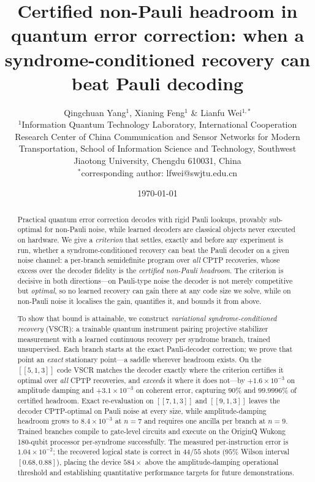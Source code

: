 \documentclass[aps,prxquantum,reprint,superscriptaddress]{revtex4-2}
\title{\textbf{Certified non-Pauli headroom in quantum error correction: when a
syndrome-conditioned recovery can beat Pauli decoding}}
\author{Qingchuan Yang$^{1}$, Xianing Feng$^{1}$ \& Lianfu Wei$^{1,*}$\\
\small $^{1}$Information Quantum Technology Laboratory, International
Cooperation Research Center of China Communication and Sensor Networks for
Modern Transportation, School of Information Science and Technology, Southwest
Jiaotong University, Chengdu 610031, China\\
\small $^{*}$corresponding author: lfwei@swjtu.edu.cn}
\date{\today}
\begin{document}
\maketitle

\begin{abstract}
\noindent
Practical quantum error correction decodes with rigid Pauli lookups, provably
sub-optimal for non-Pauli noise, while learned decoders are classical objects never
executed on hardware. We give a \emph{criterion} that settles, exactly and before
any experiment is run, whether a syndrome-conditioned recovery can beat the Pauli
decoder on a given noise channel: a per-branch semidefinite program over \emph{all}
CPTP recoveries, whose excess over the decoder fidelity is the \emph{certified
non-Pauli headroom}. The criterion is decisive in both directions---on Pauli-type
noise the decoder is not merely competitive but \emph{optimal}, so no learned
recovery can gain there at any code size we solve, while on non-Pauli noise it
localises the gain, quantifies it, and bounds it from above.

To show that bound is attainable, we construct \emph{variational syndrome-conditioned
recovery} (VSCR): a trainable quantum instrument pairing projective stabilizer
measurement with a learned continuous recovery per syndrome branch, trained 
unsupervised. Each branch starts at the exact Pauli-decoder correction; we prove 
that point an \emph{exact} stationary point---a saddle wherever headroom exists. 
On the $[\![5,1,3]\!]$ code VSCR matches the decoder exactly where the criterion 
certifies it optimal over \emph{all} CPTP recoveries, and \emph{exceeds} it where 
it does not---by $+1.6\times10^{-3}$ on amplitude damping and $+3.1\times10^{-3}$ 
on coherent error, capturing $90\%$ and $99.9996\%$ of certified headroom. Exact 
re-evaluation on $[\![7,1,3]\!]$ and $[\![9,1,3]\!]$ leaves the decoder CPTP-optimal 
on Pauli noise at every size, while amplitude-damping headroom grows to 
$8.4\times10^{-3}$ at $n=7$ and requires one ancilla per branch at $n=9$. 
Trained branches compile to gate-level circuits and execute on the OriginQ Wukong 
180-qubit processor per-syndrome successfully. The measured per-instruction error 
is $1.04\times10^{-2}$; the recovered logical state is correct in $44/55$ shots 
($95\%$ Wilson interval $[0.68,0.88]$), placing the device $584\times$ above the 
amplitude-damping operational threshold and establishing quantitative performance 
targets for future demonstrations.
\end{abstract}
\end{document}
